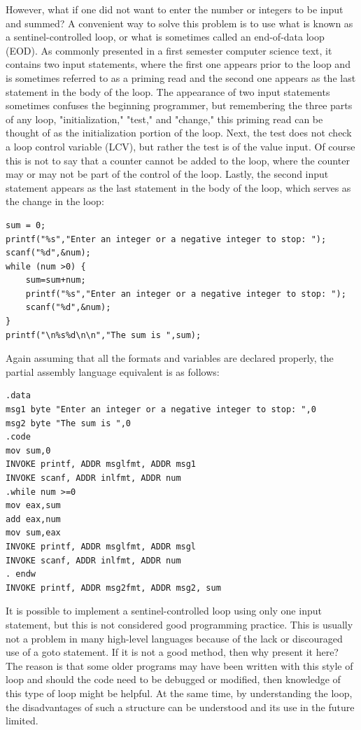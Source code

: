 \documentclass[10pt]{book}
\begin{document}
However, what if one did not want to enter the number or integers to be input and summed? A convenient way to solve this problem is to use what is known as a sentinel-controlled loop, or what is sometimes called an end-of-data loop (EOD). As commonly presented in a first semester computer science text, it contains two input statements, where the first one appears prior to the loop and is sometimes referred to as a priming read and the second one appears as the last statement in the body of the loop. The appearance of two input statements sometimes confuses the beginning programmer, but remembering the three parts of any loop, "initialization," "test," and "change," this priming read can be thought of as the initialization portion of the loop. Next, the test does not check a loop control variable (LCV), but rather the test is of the value input. Of course this is not to say that a counter cannot be added to the loop, where the counter may or may not be part of the control of the loop. Lastly, the second input statement appears as the last statement in the body of the loop, which serves as the change in the loop:
\begin{verbatim}
sum = 0;
printf("%s","Enter an integer or a negative integer to stop: ");
scanf("%d",&num);
while (num >0) {
    sum=sum+num;
    printf("%s","Enter an integer or a negative integer to stop: ");
    scanf("%d",&num);
}
printf("\n%s%d\n\n","The sum is ",sum);
\end{verbatim}

Again assuming that all the formats and variables are declared properly, the partial assembly language equivalent is as follows:

\begin{verbatim}
.data
msg1 byte "Enter an integer or a negative integer to stop: ",0
msg2 byte "The sum is ",0
.code
mov sum,0
INVOKE printf, ADDR msglfmt, ADDR msg1
INVOKE scanf, ADDR inlfmt, ADDR num
.while num >=0
mov eax,sum
add eax,num
mov sum,eax
INVOKE printf, ADDR msglfmt, ADDR msgl
INVOKE scanf, ADDR inlfmt, ADDR num
. endw
INVOKE printf, ADDR msg2fmt, ADDR msg2, sum
\end{verbatim}

It is possible to implement a sentinel-controlled loop using only one input statement, but this is not considered good programming practice. This is usually not a problem in many high-level languages because of the lack or discouraged use of a goto statement. If it is not a good method, then why present it here? The reason is that some older programs may have been written with this style of loop and should the code need to be debugged or modified, then knowledge of this type of loop might be helpful. At the same time, by understanding the loop, the disadvantages of such a structure can be understood and its use in the future limited.
\end{document}
